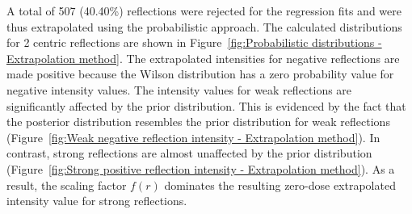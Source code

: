 A total of 507 (40.40\%) reflections were rejected for the regression fits and were thus extrapolated using the probabilistic approach.
The calculated distributions for 2 centric reflections are shown in Figure~\ref{fig:Probabilistic distributions - Extrapolation method}.
The extrapolated intensities for negative reflections are made positive because the Wilson distribution has a zero probability value for negative intensity values.
The intensity values for weak reflections are significantly affected by the prior distribution.
This is evidenced by the fact that the posterior distribution resembles the prior distribution for weak reflections (Figure~\ref{fig:Weak negative reflection intensity - Extrapolation method}).
In contrast, strong reflections are almost unaffected by the prior distribution (Figure~\ref{fig:Strong positive reflection intensity - Extrapolation method}).
As a result, the scaling factor $f(r)$ dominates the resulting zero-dose extrapolated intensity value for strong reflections.
